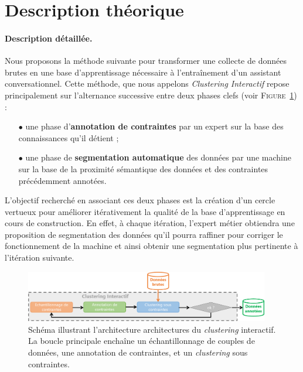 	\section{Description théorique}
	\label{section:3.2-DESCRIPTION-THEORIQUE}

		\paragraph{Description détaillée.}
		
		Nous proposons la méthode suivante pour transformer une collecte de données brutes en une base d'apprentissage nécessaire à l’entraînement d'un assistant conversationnel.
		Cette méthode, que nous appelons \textit{Clustering Interactif} repose principalement sur l'alternance successive entre deux phases clefs (voir \textsc{Figure~\ref{figure:3.2-CLUSTERING-INTERACTIF}}) :
		\begin{itemize}
			\item[\(\bullet\)] une phase d'\textbf{annotation de contraintes}
			par un expert sur la base des connaissances qu'il détient ;
			\item[\(\bullet\)] une phase de \textbf{segmentation automatique} des données
			par une machine sur la base de la proximité sémantique des données et des contraintes précédemment annotées.
		\end{itemize}
		
		L'objectif recherché en associant ces deux phases est la création d'un cercle vertueux pour améliorer itérativement la qualité de la base d'apprentissage en cours de construction.
		En effet, à chaque itération, l'expert métier obtiendra une proposition de segmentation des données qu'il pourra raffiner pour corriger le fonctionnement de la machine et ainsi obtenir une segmentation plus pertinente à l'itération suivante.
		
		\begin{figure}[!htb]
			\centering
			\includegraphics[width=0.95\textwidth]{figures/interactive-clustering-architecture-sequentielle}
			\caption{
				Schéma illustrant l'architecture architectures du \textit{clustering} interactif. La boucle principale enchaîne un échantillonnage de couples de données, une annotation de contraintes, et un \textit{clustering} sous contraintes.
			}
			\label{figure:3.2-CLUSTERING-INTERACTIF}
		\end{figure}
		
